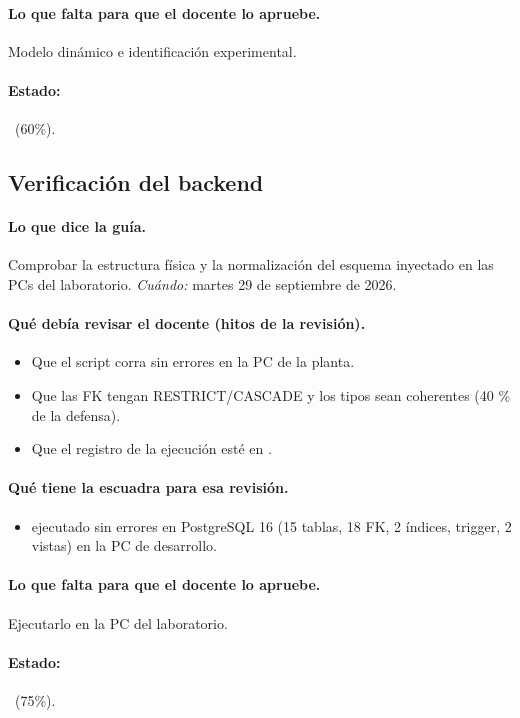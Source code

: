 \documentclass[a4paper,11pt]{article}
\begin{document}
\paragraph{Lo que falta para que el docente lo apruebe.} Modelo dinámico e identificación experimental.
\paragraph{Estado:} \parcial~(60\%).
\subsection{Verificación del backend}
\paragraph{Lo que dice la guía.} Comprobar la estructura física y la normalización del esquema inyectado en las PCs del laboratorio. \textit{Cuándo:} martes 29 de septiembre de 2026.
\paragraph{Qué debía revisar el docente (hitos de la revisión).}
\begin{itemize}
\item[$\square$] Que el script corra sin errores en la PC de la planta.
\item[$\square$] Que las FK tengan RESTRICT/CASCADE y los tipos sean coherentes (40 \% de la defensa).
\item[$\square$] Que el registro de la ejecución esté en .
\end{itemize}
\paragraph{Qué tiene la escuadra para esa revisión.}
\begin{itemize}
\item {} ejecutado sin errores en PostgreSQL 16 (15 tablas, 18 FK, 2 índices, trigger, 2 vistas) en la PC de desarrollo.
\end{itemize}
\paragraph{Lo que falta para que el docente lo apruebe.} Ejecutarlo en la PC del laboratorio.
\paragraph{Estado:} \parcial~(75\%).
\end{document}
